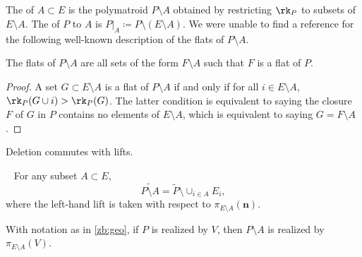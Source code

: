 \subsection{}\label{operations}
The  of $A \subset E$ is the polymatroid $P \setminus A$ obtained by restricting $\rk_P$ to subsets of $E \setminus A$.
The  of $P$ to $A$ is $P|_A \coloneqq  P \setminus (E \setminus A)$.
We were unable to find a reference for the following well-known description of the flats of $P \setminus A$.
\begin{lemm}\label{deletionflats}
  The flats of $P \setminus A$ are all sets of the form $F \setminus A$ such that $F$ is a flat of $P$.
\end{lemm}
\begin{proof}
    A set $G \subset E\setminus A$ is a flat of $P \setminus A$ if and only if for all $i \in E \setminus A$, $\rk_P(G \cup i) > \rk_P(G)$.
  The latter condition is equivalent to saying the closure $F$ of $G$ in $P$ contains no elements of $E \setminus A$, which is equivalent to saying $G = F \setminus A$.
\end{proof}
 Deletion commutes with lifts.
\begin{lemm}\label{deletioncommutes}~\cite[Lemma 2.14{\footnotemark[\value{footnote}]{}}]{CHLSW22}
 For any subset $A\subset E$, 
 \[
 \widetilde{P \setminus A} = \widetilde P \setminus \cup_{i \in A} E_i,
 \]
where the left-hand lift is taken with respect to $\pi_{E \setminus A}(\mathbf n)$.
\end{lemm}
\begin{rema}
  With notation as in \cref{zb:geo}, if $P$ is realized by $V$, then $P \setminus A$ is realized by $\pi_{E \setminus A}(V)$.
\end{rema}
